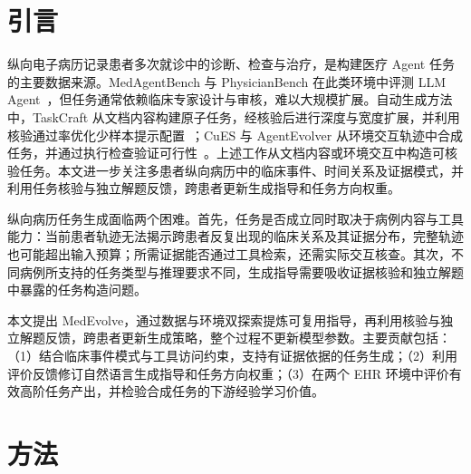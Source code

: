 \maketitle

\begin{abstract}
从纵向电子健康记录（EHR）中为医疗 Agent 生成高质量任务面临挑战：不同患者记录能够支持的临床关系各不相同，而可用工具又限制了证据的检索方式。本文提出 MedEvolve，从任务证据锚定与策略进化两个互补层面改进医疗任务生成。在任务构建层面，双探索将反复出现的临床时序模式与工具访问约束提炼为可复用的指导。在策略层面，反馈驱动的进化进一步将核验与独立解题结果转化为跨患者的任务构建规则和任务方向偏好，而非仅修复单个问题。
在两个基准上，MedEvolve 的核验通过高阶任务产出率均高于基线方法。加入其合成任务后，ACE 与 Reflexion 在官方测试任务上的成功率分别提高 6 和 2 个百分点。
\end{abstract}

\section{引言}

纵向电子病历记录患者多次就诊中的诊断、检查与治疗，是构建医疗 Agent 任务的主要数据来源。MedAgentBench 与 PhysicianBench 在此类环境中评测 LLM Agent~\citep{jiang2025medagentbench,liu2026physicianbench}，但任务通常依赖临床专家设计与审核，难以大规模扩展。自动生成方法中，TaskCraft 从文档内容构建原子任务，经核验后进行深度与宽度扩展，并利用核验通过率优化少样本提示配置~\citep{shi2025taskcraft}；CuES 与 AgentEvolver 从环境交互轨迹中合成任务，并通过执行检查验证可行性~\citep{mai2025cues,zhai2025agentevolver}。上述工作从文档内容或环境交互中构造可核验任务。本文进一步关注多患者纵向病历中的临床事件、时间关系及证据模式，并利用任务核验与独立解题反馈，跨患者更新生成指导和任务方向权重。

纵向病历任务生成面临两个困难。首先，任务是否成立同时取决于病例内容与工具能力：当前患者轨迹无法揭示跨患者反复出现的临床关系及其证据分布，完整轨迹也可能超出输入预算；所需证据能否通过工具检索，还需实际交互核查。其次，不同病例所支持的任务类型与推理要求不同，生成指导需要吸收证据核验和独立解题中暴露的任务构造问题。

本文提出 MedEvolve，通过数据与环境双探索提炼可复用指导，再利用核验与独立解题反馈，跨患者更新生成策略，整个过程不更新模型参数。主要贡献包括：（1）结合临床事件模式与工具访问约束，支持有证据依据的任务生成；（2）利用评价反馈修订自然语言生成指导和任务方向权重；（3）在两个 EHR 环境中评价有效高阶任务产出，并检验合成任务的下游经验学习价值。

\section{方法}


